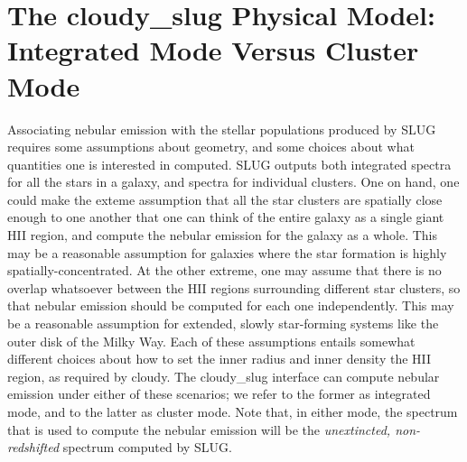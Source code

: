 \documentclass[letterpaper,10pt,english]{sphinxmanual}
\begin{document}
\section{The cloudy\_slug Physical Model: Integrated Mode Versus Cluster Mode}
\label{cloudy:ssec-cloudy-cluster}\label{cloudy:the-cloudy-slug-physical-model-integrated-mode-versus-cluster-mode}
Associating nebular emission with the stellar populations produced by
SLUG requires some assumptions about geometry, and some choices about
what quantities one is interested in computed. SLUG outputs both
integrated spectra for all the stars in a galaxy, and spectra for
individual clusters. One on hand, one could make the exteme assumption
that all the star clusters are spatially close enough to one another
that one can think of the entire galaxy as a single giant HII region,
and compute the nebular emission for the galaxy as a whole. This may
be a reasonable assumption for galaxies where the star formation is
highly spatially-concentrated. At the other extreme, one may assume that
there is no overlap whatsoever between the HII regions surrounding
different star clusters, so that nebular emission should be computed
for each one independently. This may be a reasonable assumption for
extended, slowly star-forming systems like the outer disk of the Milky
Way. Each of these assumptions entails somewhat different choices
about how to set the inner radius and inner density the HII region, as
required by cloudy. The cloudy\_slug interface can compute nebular
emission under either of these scenarios; we refer to the former as
integrated mode, and to the latter as cluster mode. Note that, in
either mode, the spectrum that is used to compute the nebular emission
will be the \emph{unextincted, non-redshifted} spectrum computed by SLUG.
\end{document}
